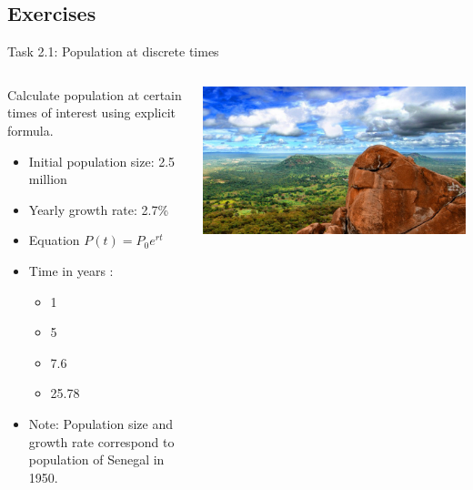 \subsection{Exercises}

\begin{frame}{Task 2.1:  Population at discrete times}
        
\begin{columns}
    \begin{column}{0.6\textwidth}
Calculate population at certain times of interest using explicit formula. 
\begin{itemize}
\item Initial population size: 2.5 million
\item Yearly growth rate: 2.7\%
\item Equation $P(t) = P_0 e^{rt} $ 
\item Time in years :
    \begin{itemize}
        \item 1 
        \item 5
        \item 7.6
        \item 25.78
    \end{itemize}
\item Note: Population size and growth rate correspond to population of Senegal in 1950.
\end{itemize}
    \end{column}

    \begin{column}{0.4\textwidth}
    \includegraphics[scale = 0.2]{lesson_1/images/malthusian_senegal.jpeg}
\end{column}
\end{columns}


\end{frame}

